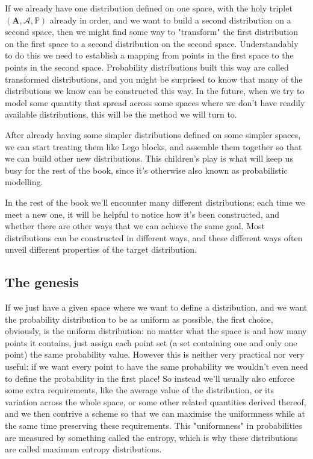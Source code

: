 \documentclass[11pt]{article}
\begin{document}
If we already have one distribution defined on one space, with the holy triplet \((\mathbf{A}, \mathcal{A}, \mathbb{P})\) already in order, and we want to build a second distribution on a second space, then we might find some way to "transform" the first distribution on the first space to a second distribution on the second space. Understandably to do this we need to establish a mapping from points in the first space to the points in the second space. Probability distributions built this way are called transformed distributions, and you might be surprised to know that many of the distributions we know can be constructed this way. In the future, when we try to model some quantity that spread across some spaces where we don't have readily available distributions, this will be the method we will turn to.

After already having some simpler distributions defined on some simpler spaces, we can start treating them like Lego blocks, and assemble them together so that we can build other new distributions. This children's play is what will keep us busy for the rest of the book, since it's otherwise also known as probabilistic modelling.

In the rest of the book we'll encounter many different distributions; each time we meet a new one, it will be helpful to notice how it's been constructed, and whether there are other ways that we can achieve the same goal. Most distributions can be constructed in different ways, and these different ways often unveil different properties of the target distribution.

\subsection{The genesis}
\label{sec:orgf53bfaf}

If we just have a given space where we want to define a distribution, and we want the probability distribution to be as uniform as possible, the first choice, obviously, is the uniform distribution: no matter what the space is and how many points it contains, just assign each point set (a set containing one and only one point) the same probability value. However this is neither very practical nor very useful: if we want every point to have the same probability we wouldn't even need to define the probability in the first place! So instead we'll usually also enforce some extra requirements, like the average value of the distribution, or its variation across the whole space, or some other related quantities derived thereof, and we then contrive a scheme so that we can maximise the uniformness while at the same time preserving these requirements. This "uniformness" in probabilities are measured by something called the entropy, which is why these distributions are called maximum entropy distributions.
\end{document}
